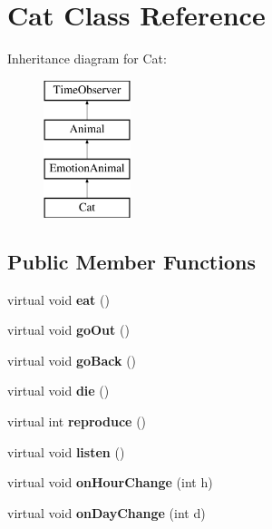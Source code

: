 \hypertarget{class_cat}{}\section{Cat Class Reference}
\label{class_cat}
Inheritance diagram for Cat\+:\begin{figure}[H]
\begin{center}
\leavevmode
\includegraphics[height=4.000000cm]{class_cat}
\end{center}
\end{figure}
\subsection*{Public Member Functions}
\begin{DoxyCompactItemize}
\item 
\mbox{\label{class_cat_a66ece6598afa3205ff6291323ff24964}} 
virtual void {\bfseries eat} ()
\item 
\mbox{\label{class_cat_a6cf8b6c4daf93d9e89cb5665b8df3937}} 
virtual void {\bfseries go\+Out} ()
\item 
\mbox{\label{class_cat_af75e2455e9f7f664d1f5dfd1ece285e7}} 
virtual void {\bfseries go\+Back} ()
\item 
\mbox{\label{class_cat_aed1c7db476cda98bddd8f649cb0a4fbf}} 
virtual void {\bfseries die} ()
\item 
\mbox{\label{class_cat_ae391b6b7c157fc4f64ed76ea1f4d1b89}} 
virtual int {\bfseries reproduce} ()
\item 
\mbox{\label{class_cat_aede6b89d75f9a11fc4992a1023bc69c8}} 
virtual void {\bfseries listen} ()
\item 
\mbox{\label{class_cat_a1776cfe2d85ec783cc2f73a9adb7c09c}} 
virtual void {\bfseries on\+Hour\+Change} (int h)
\item 
\mbox{\label{class_cat_a352d9f1603003aa4bb5e5cd8607cd27a}} 
virtual void {\bfseries on\+Day\+Change} (int d)
\end{DoxyCompactItemize}
